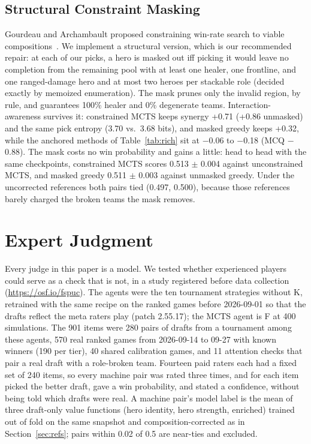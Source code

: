 \documentclass[journal]{IEEEtran}
\begin{document}
\subsection{Structural Constraint Masking}
\label{sec:constrained}

Gourdeau and Archambault proposed constraining win-rate search to viable compositions~\cite{gourdeau2021discriminative}. We implement a structural version, which is our recommended repair: at each of our picks, a hero is masked out iff picking it would leave no completion from the remaining pool with at least one healer, one frontline, and one ranged-damage hero and at most two heroes per stackable role (decided exactly by memoized enumeration). The mask prunes only the invalid region, by rule, and guarantees 100\% healer and 0\% degenerate teams. Interaction-awareness survives it: constrained MCTS keeps synergy +0.71 (+0.86 unmasked) and the same pick entropy (3.70 vs.\ 3.68 bits), and masked greedy keeps +0.32, while the anchored methods of Table~\ref{tab:rich} sit at $-$0.06 to $-$0.18 (MCQ $-$0.88). The mask costs no win probability and gains a little: head to head with the same checkpoints, constrained MCTS scores 0.513 $\pm$ 0.004 against unconstrained MCTS, and masked greedy 0.511 $\pm$ 0.003 against unmasked greedy. Under the uncorrected references both pairs tied (0.497, 0.500), because those references barely charged the broken teams the mask removes.

\section{Expert Judgment}
\label{sec:expert}

Every judge in this paper is a model. We tested whether experienced players could serve as a check that is not, in a study registered before data collection (\url{https://osf.io/fspuc}). The agents were the ten tournament strategies without K, retrained with the same recipe on the ranked games before 2026-09-01 so that the drafts reflect the meta raters play (patch 2.55.17); the MCTS agent is F at 400 simulations. The 901 items were 280 pairs of drafts from a tournament among these agents, 570 real ranked games from 2026-09-14 to 09-27 with known winners (190 per tier), 40 shared calibration games, and 11 attention checks that pair a real draft with a role-broken team. Fourteen paid raters each had a fixed set of 240 items, so every machine pair was rated three times, and for each item picked the better draft, gave a win probability, and stated a confidence, without being told which drafts were real. A machine pair's model label is the mean of three draft-only value functions (hero identity, hero strength, enriched) trained out of fold on the same snapshot and composition-corrected as in Section~\ref{sec:refs}; pairs within 0.02 of 0.5 are near-ties and excluded.
\end{document}
